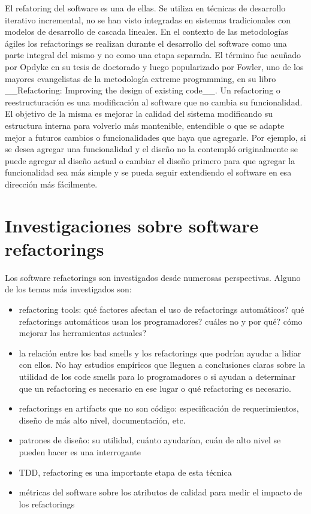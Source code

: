 El refatoring del software es una de ellas. Se utiliza en técnicas de desarrollo iterativo
incremental, no se han visto integradas en sistemas tradicionales con modelos de desarrollo de cascada lineales.
En el contexto de las metodologías ágiles los refactorings se realizan durante el desarrollo del
software como una parte integral del mismo y no como una etapa separada. El término fue acuñado por
Opdyke en su tesis de doctorado y luego popularizado por Fowler, uno de los mayores evangelistas de
la metodología extreme programming, en su libro __Refactoring: Improving the design of existing
code__. Un refactoring o reestructuración es una modificación al software que no cambia su funcionalidad. El objetivo
de la misma es mejorar la calidad del sistema modificando su estructura interna para volverlo más mantenible,
entendible o que se adapte mejor a futuros cambios o funcionalidades que haya que agregarle. Por
ejemplo, si se desea agregar una funcionalidad y el diseño no la contempló originalmente se puede
agregar al diseño actual o cambiar el diseño primero para que agregar la funcionalidad sea más
simple y se pueda seguir extendiendo el software en esa dirección más fácilmente.


\section{Investigaciones sobre software refactorings}
Los software refactorings son investigados desde numerosas perspectivas. Alguno de los temas más
investigados son:
\begin{itemize}
    \item refactoring tools: qué factores afectan el uso de refactorings automáticos? qué
refactorings automáticos usan los programadores? cuáles no y por qué? cómo mejorar las herramientas actuales?
    \item la relación entre los bad smells y los refactorings que podrían ayudar a lidiar con ellos. No hay estudios
empíricos que lleguen a conclusiones claras sobre la utilidad de los code smells para lo
programadores o si ayudan a determinar que un refactoring es necesario en ese lugar o qué
refactoring es necesario.
    \item refactorings en artifacts que no son código: especificación de requerimientos, diseño de más alto nivel, documentación, etc.
    \item patrones de diseño: su utilidad, cuánto ayudarían, cuán de alto nivel se pueden hacer es una interrogante
    \item TDD, refactoring es una importante etapa de esta técnica 
    \item métricas del software sobre los atributos de calidad para medir el impacto de los
refactorings  
\end{itemize}


